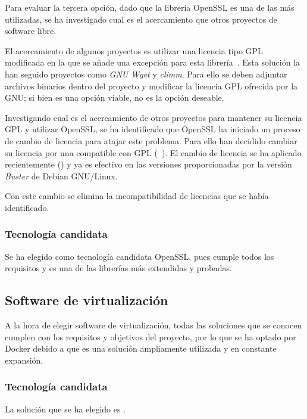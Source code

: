 \par Para evaluar la tercera opción, dado que la librería OpenSSL es una de las más utilizadas, se ha investigado cual es el acercamiento que otros proyectos de software libre.
\par El acercamiento de algunos proyectos es utilizar una licencia tipo GPL modificada en la que se añade una excepción para esta librería~\cite{opensslexception}. Esta solución la han seguido proyectos como {\em GNU Wget} y {\em climm}. Para
ello se deben adjuntar archivos binarios dentro del proyecto y modificar la licencia GPL ofrecida por la GNU; si bien es una opción viable, no es la opción deseable.
\par Investigando cual es el acercamiento de otros proyectos para mantener su licencia GPL y utilizar OpenSSL, se ha identificado que OpenSSL ha iniciado un proceso de cambio de licencia para atajar este problema. Para ello han decidido
cambiar su licencia por una compatible con GPL (~\cite[Anuncio del cambio de licencia]{opensslannouncement}). El cambio de licencia se ha aplicado recientemente (\cite[{\em Pull request} del cambio]{opensslpullrequest}) y ya es efectivo en las
versiones proporcionadas por la versión {\em Buster} de Debian GNU/Linux.
\par Con este cambio se elimina la incompatibilidad de licencias que se había identificado.

\subsubsection{Tecnología candidata}
\par Se ha elegido como tecnología candidata OpenSSL, pues cumple todos los requisitos y es una de las librerías más extendidas y probadas.

\subsection{Software de virtualización}
\par A la hora de elegir software de virtualización, todas las soluciones que se conocen cumplen con los requisitos y objetivos del proyecto, por lo que se ha optado por Docker debido a que es una solución ampliamente utilizada y en constante
expansión.

\subsubsection{Tecnología candidata}
\par La solución que se ha elegido es \cite{docker}.

